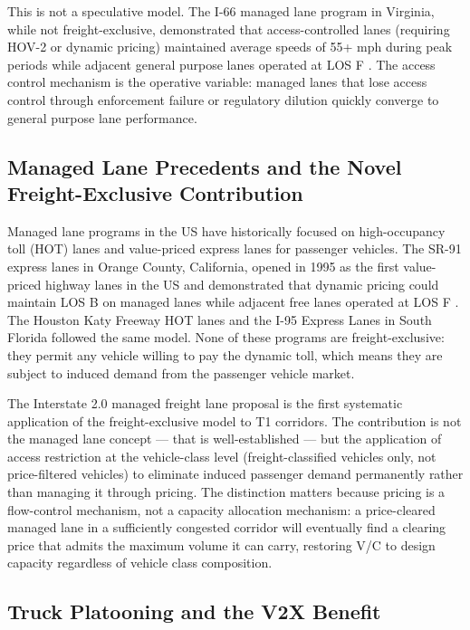 This is not a speculative model. The I-66 managed lane program in Virginia, while not freight-exclusive, demonstrated that access-controlled lanes (requiring HOV-2 or dynamic pricing) maintained average speeds of 55+ mph during peak periods while adjacent general purpose lanes operated at LOS F \citep{FHWA_ML2021}. The access control mechanism is the operative variable: managed lanes that lose access control through enforcement failure or regulatory dilution quickly converge to general purpose lane performance.

\subsection{Managed Lane Precedents and the Novel Freight-Exclusive Contribution}

Managed lane programs in the US have historically focused on high-occupancy toll (HOT) lanes and value-priced express lanes for passenger vehicles. The SR-91 express lanes in Orange County, California, opened in 1995 as the first value-priced highway lanes in the US and demonstrated that dynamic pricing could maintain LOS B on managed lanes while adjacent free lanes operated at LOS F \citep{FHWA_ML2021}. The Houston Katy Freeway HOT lanes and the I-95 Express Lanes in South Florida followed the same model. None of these programs are freight-exclusive: they permit any vehicle willing to pay the dynamic toll, which means they are subject to induced demand from the passenger vehicle market.

The Interstate 2.0 managed freight lane proposal is the first systematic application of the freight-exclusive model to T1 corridors. The contribution is not the managed lane concept --- that is well-established --- but the application of access restriction at the vehicle-class level (freight-classified vehicles only, not price-filtered vehicles) to eliminate induced passenger demand permanently rather than managing it through pricing. The distinction matters because pricing is a flow-control mechanism, not a capacity allocation mechanism: a price-cleared managed lane in a sufficiently congested corridor will eventually find a clearing price that admits the maximum volume it can carry, restoring V/C to design capacity regardless of vehicle class composition.

\subsection{Truck Platooning and the V2X Benefit}

